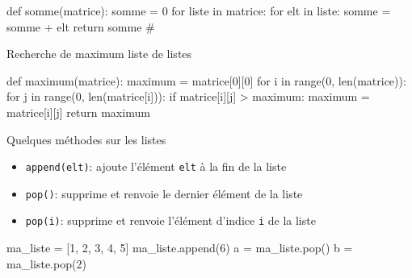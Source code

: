 \pagebreak

\begin{minipage}{0.47\linewidth}
\begin{easybox}{}
		\begin{CodePythontexAlt}[Largeur=1\linewidth,Centre,PremLigne=1]{}
def somme(matrice):
	somme = 0
	for liste in matrice:
		for elt in liste:
			somme = somme + elt
	return somme
#
		\end{CodePythontexAlt}
\end{easybox}
\end{minipage}\hfill
	\begin{minipage}{0.51\linewidth}
		\begin{easybox}{Recherche de maximum liste de listes}{}
	\begin{CodePythontexAlt}[Largeur=1\linewidth,Centre,PremLigne=1]{}
def maximum(matrice):
	maximum = matrice[0][0]
	for i in range(0, len(matrice)):
		for j in range(0, len(matrice[i])):
			if matrice[i][j] > maximum:
				maximum = matrice[i][j]
	return maximum
\end{CodePythontexAlt}
	\end{easybox}
	\end{minipage}


\begin{easybox}{Quelques méthodes sur les listes}{}

	\begin{minipage}{0.65\linewidth}
		\begin{itemize}
\item \verb|append(elt)|: ajoute l'élément \verb|elt| à la fin de la liste	
\item \verb|pop()|: supprime et renvoie le dernier élément de la liste
\item \verb|pop(i)|: supprime et renvoie l'élément d'indice \verb|i| de la liste
\end{itemize}

	\end{minipage}\hfill
	\begin{minipage}{0.35\linewidth}
	\begin{CodePythontexAlt}[Largeur=1\linewidth,Centre,PremLigne=1]{}
ma_liste = [1, 2, 3, 4, 5]
ma_liste.append(6)
a = ma_liste.pop()
b = ma_liste.pop(2)
		\end{CodePythontexAlt}
	\end{minipage}
\end{easybox}

